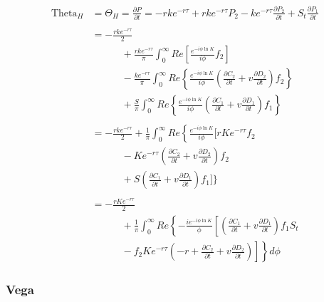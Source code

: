 \documentclass[a4paper]{article}
\begin{document}
\begin{align*}
	\mbox{Theta}_H 
	&
	=
	\Theta_H = \frac{\partial P}{\partial t} = 
	-rke^{-r\tau} 
	+ rke^{-r\tau}P_2 
	- ke^{-r\tau}\frac{\partial P_2}{\partial t}
	+ S_t\frac{\partial P_1}{\partial t}
	\\
	&
	\\
	&
	=
	- \frac{rke^{-r\tau}}{2} \\
	&
	\quad \quad \quad + \frac{rke^{-r\tau}}{\pi} \int_0^{\infty} Re \left[ \frac{e^{-i\phi \ln K}}{i\phi}f_2 \right] \\
	& \quad \quad \quad - \frac{ke^{-r\tau}}{\pi} \int_0^{\infty} Re \left\{ \frac{e^{-i\phi \ln K}}{i\phi} \left( \frac{\partial C_2}{\partial t} + v\frac{\partial D_2}{\partial t} \right) f_2 \right\} \\
	& \quad \quad \quad + \frac{S}{\pi} \int_0^{\infty} Re \left\{ \frac{e^{-i\phi \ln K}}{i\phi} \left( \frac{\partial C_1}{\partial t} + v\frac{\partial D_1}{\partial t} \right) f_1 \right\} 
	\\
	&
	\\
	&
	=
	- \frac{rke^{-r\tau}}{2} + \frac{1}{\pi} \int_0^{\infty} Re \left\{ \frac{e^{-i\phi \ln K}}{i\phi} \bigg[ rKe^{-r\tau} f_2 \\
	& \quad \quad \quad - Ke^{-r\tau} \left(\frac{\partial C_2}{\partial t} + v\frac{\partial D_2}{\partial t} \right) f_2 \\
	& \quad \quad \quad + S \left(\frac{\partial C_1}{\partial t} + v\frac{\partial D_1}{\partial t} \right) f_1  \bigg] \bigg\}
	\\
	&
	\\
	&
	=
	- \frac{rKe^{-r\tau}}{2} \\
	& \quad \quad \quad + \frac{1}{\pi} \int_0^\infty Re \left\{-\frac{ie^{-i\phi \ln K}}{\phi} \left[ \left( \frac{\partial C_1}{\partial t} + v\frac{\partial D_1}{\partial t} \right ) f_1S_t  \\
	& \quad \quad \quad - f_2Ke^{-r\tau}\left. \left. \left(-r + \frac{\partial C_2}{\partial t} + v\frac{\partial D_2}{\partial t} \right) \right] \right\} d\phi
\end{align*}







\newpage







\subsubsection*{Vega}
\end{document}
